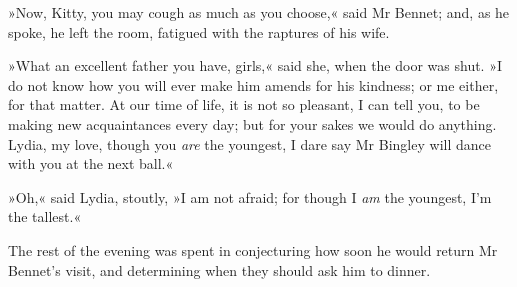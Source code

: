 »Now, Kitty, you may cough as much as you choose,« said Mr Bennet; and, as he spoke, he left the room, fatigued with the raptures of his wife.

»What an excellent father you have, girls,« said she, when the door was shut. »I do not know how you will ever make him amends for his kindness; or me either, for that matter. At our time of life, it is not so pleasant, I can tell you, to be making new acquaintances every day; but for your sakes we would do anything. Lydia, my love, though you \textit{are} the youngest, I dare say Mr Bingley will dance with you at the next ball.«

»Oh,« said Lydia, stoutly, »I am not afraid; for though I \textit{am} the youngest, I'm the tallest.«

The rest of the evening was spent in conjecturing how soon he would return Mr Bennet's visit, and determining when they should ask him to dinner.